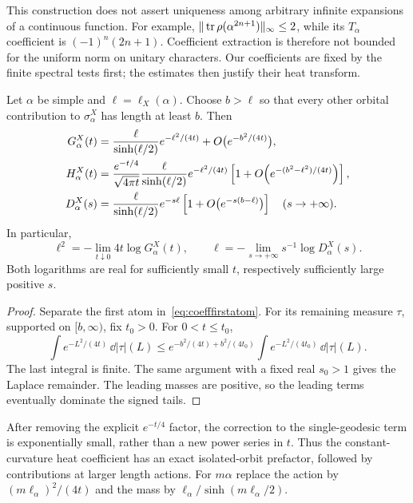 This construction does not assert uniqueness among arbitrary
infinite expansions of a continuous function. For example,
$\|\operatorname{tr}\rho(\alpha^{2n+1})\|_\infty\leq2$, while its
$T_\alpha$ coefficient is $(-1)^n(2n+1)$. Coefficient extraction
is therefore not bounded for the uniform norm on unitary characters.
Our coefficients are fixed by the finite spectral tests first;
the estimates then justify their heat transform.

\begin{proposition}
\label{prop:coeffheatfirst}
Let $\alpha$ be simple and $\ell=\ell_X(\alpha)$. Choose
$b>\ell$ so that every other orbital contribution to
$\sigma_\alpha^X$ has length at least $b$. Then
\begin{align}
 G_\alpha^X(t)
 &=\frac{\ell}{\sinh(\ell/2)}e^{-\ell^2/(4t)}
   +O\bigl(e^{-b^2/(4t)}\bigr),\notag\\
 H_\alpha^X(t)
 &=\frac{e^{-t/4}}{\sqrt{4\pi t}}
   \frac{\ell}{\sinh(\ell/2)}e^{-\ell^2/(4t)}
   \left[1+O\!\left(e^{-(b^2-\ell^2)/(4t)}\right)\right],
 \label{eq:coeffheatfirst}\\
 D_\alpha^X(s)
 &=\frac{\ell}{\sinh(\ell/2)}e^{-s\ell}
   \left[1+O\bigl(e^{-s(b-\ell)}\bigr)\right]
   \quad(s\to+\infty).
 \label{eq:coeffLaplacefirst}
\end{align}
In particular,
\begin{equation}
 \boxed{
 \ell^2=-\lim_{t\downarrow0}4t\log G_\alpha^X(t),\qquad
 \ell=-\lim_{s\to+\infty}s^{-1}\log D_\alpha^X(s).
 }
 \label{eq:coefflengthlimits}
\end{equation}
Both logarithms are real for sufficiently small $t$, respectively
sufficiently large positive $s$.
\end{proposition}

\begin{proof}
Separate the first atom in~\eqref{eq:coefffirstatom}. For its
remaining measure $\tau$, supported on $[b,\infty)$, fix $t_0>0$.
For $0<t\leq t_0$,
\[
 \int e^{-L^2/(4t)}\,\dd|\tau|(L)
 \leq e^{-b^2/(4t)+b^2/(4t_0)}
       \int e^{-L^2/(4t_0)}\,\dd|\tau|(L).
\]
The last integral is finite. The same argument with a fixed real
$s_0>1$ gives the Laplace remainder. The leading masses are
positive, so the leading terms eventually dominate the signed tails.
\end{proof}

After removing the explicit $e^{-t/4}$ factor, the correction to
the single-geodesic term is exponentially small, rather than a new
power series in $t$. Thus the constant-curvature heat coefficient
has an exact isolated-orbit prefactor, followed by contributions at
larger length actions. For $m\alpha$ replace the action by
$(m\ell_\alpha)^2/(4t)$ and the mass by
$\ell_\alpha/\sinh(m\ell_\alpha/2)$.

